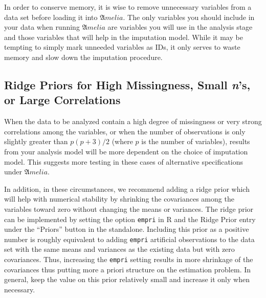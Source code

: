 \documentclass[12pt,titlepage]{article}
\begin{document}
In order to conserve memory, it is wise to remove unnecessary variables from a data set before loading it into ${\mathfrak Amelia}$.  The only variables you should include in your data when running ${\mathfrak Amelia}$ are variables you will use in the analysis stage and those variables that will help in the imputation model.  While it may be tempting to simply mark unneeded variables as IDs, it only serves to waste memory and slow down the imputation procedure.



\subsection{Ridge Priors for High Missingness, Small \emph{n}'s, or Large Correlations}
\label{sec:prior}
When the data to be analyzed contain a high degree of missingness or very strong correlations among the variables, or when the number of observations is only slightly greater than $p(p+3)/2$ (where $p$ is the number of variables), results from your analysis model will be more dependent on the choice of imputation model.  This suggests more testing in these cases of alternative specifications under ${\mathfrak Amelia}$.

In addition, in these circumstances, we recommend adding a ridge prior which will help with numerical stability by shrinking the covariances among the variables toward zero without changing the means or variances.  The ridge prior can be implemented by setting the option \texttt{empri} in R and the Ridge Prior entry under the ``Priors'' button in the standalone.  Including this prior as a positive number is roughly equivalent to adding \texttt{empri} artificial observations to the data set with the same means and variances as the existing data but with zero covariances.  Thus, increasing the \texttt{empri} setting results in more shrinkage of the covariances thus putting more a priori structure on the estimation problem.  In general, keep the value on this prior relatively small and increase it only when necessary.



\end{document}
